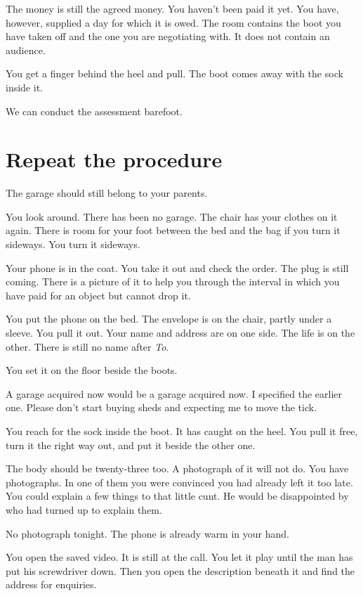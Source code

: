 \documentclass[11pt,oneside]{book}
\begin{document}
The money is still the agreed money. You haven't been paid it yet. You have, however, supplied a day for which it is owed. The room contains the boot you have taken off and the one you are negotiating with. It does not contain an audience.

You get a finger behind the heel and pull. The boot comes away with the sock inside it.

We can conduct the assessment barefoot.

\section*{Repeat the procedure}

The garage should still belong to your parents.

You look around. There has been no garage. The chair has your clothes on it again. There is room for your foot between the bed and the bag if you turn it sideways. You turn it sideways.

Your phone is in the coat. You take it out and check the order. The plug is still coming. There is a picture of it to help you through the interval in which you have paid for an object but cannot drop it.

You put the phone on the bed. The envelope is on the chair, partly under a sleeve. You pull it out. Your name and address are on one side. The life is on the other. There is still no name after \emph{To}.

You set it on the floor beside the boots.

A garage acquired now would be a garage acquired now. I specified the earlier one. Please don't start buying sheds and expecting me to move the tick.

You reach for the sock inside the boot. It has caught on the heel. You pull it free, turn it the right way out, and put it beside the other one.

The body should be twenty-three too. A photograph of it will not do. You have photographs. In one of them you were convinced you had already left it too late. You could explain a few things to that little cunt. He would be disappointed by who had turned up to explain them.

No photograph tonight. The phone is already warm in your hand.

You open the saved video. It is still at the call. You let it play until the man has put his screwdriver down. Then you open the description beneath it and find the address for enquiries.
\end{document}
